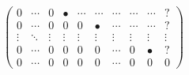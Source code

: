 \documentclass[varwidth=true, border=10pt]{standalone}
\begin{document}
\[
\left(
\begin{array}{cccccccccc}
    0 & \cdots & 0 & \bullet & \cdots & \cdots & \cdots & \cdots & \cdots & ? \\
    0 & \cdots & 0 & 0 & 0 & \bullet & \cdots & \cdots & \cdots & ? \\
    \vdots & \ddots& \vdots & \vdots & \vdots & \vdots & \vdots & \vdots & \vdots & \vdots \\
    0 & \cdots & 0 & 0 & 0 & 0 & \cdots & 0 & \bullet & ? \\
    0 & \cdots & 0 & 0 & 0 & 0 & \cdots & 0 & 0 & 0
\end{array}
\right)
\]
\end{document}
